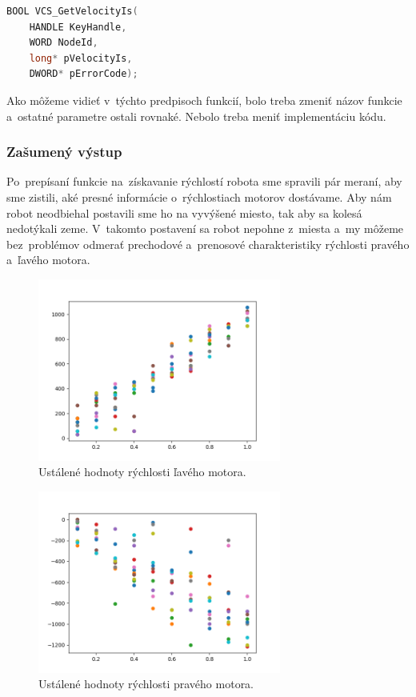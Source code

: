 \begin{lstlisting}[language=C++]
BOOL VCS_GetVelocityIs(
	HANDLE KeyHandle,
	WORD NodeId,
	long* pVelocityIs,
	DWORD* pErrorCode);
\end{lstlisting}

\noindent Ako môžeme vidieť v~týchto predpisoch funkcií, bolo treba zmeniť názov funkcie a~ostatné parametre ostali rovnaké.
Nebolo treba meniť implementáciu kódu.

\subsubsection{Zašumený výstup}

Po~prepísaní funkcie na~získavanie rýchlostí robota sme spravili pár meraní, aby sme zistili, aké presné informácie o~rýchlostiach
motorov dostávame. Aby nám robot neodbiehal postavili sme ho na vyvýšené miesto, tak aby sa kolesá nedotýkali zeme. V~takomto
postavení sa robot nepohne z~miesta a~my môžeme bez~problémov odmerať prechodové a~prenosové charakteristiky rýchlosti pravého
a~ľavého motora.

\begin{figure}[!htbp]
	\begin{center}
		\includegraphics[width=8cm]{img/Left_wheel.png}
	\end{center}
	\caption{Ustálené hodnoty rýchlosti ľavého motora. }
	\label{fig:laveKoleso}
\end{figure}

\begin{figure}[!htbp]
	\begin{center}
		\includegraphics[width=8cm]{img/Right_wheel.png}
	\end{center}
	\caption{Ustálené hodnoty rýchlosti pravého motora. }
	\label{fig:praveKoleso}
\end{figure}

